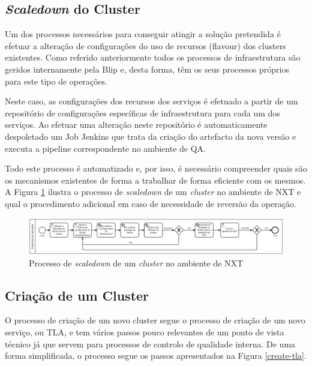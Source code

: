 \subsection{\textit{Scaledown} do Cluster}

Um dos processos necessários para conseguir atingir a solução pretendida é efetuar a alteração
de configurações do uso de recursos (\gls{flavour}) dos \glspl{cluster} existentes. Como
referido anteriormente todos os processos de infraestrutura são geridos internamente pela Blip e,
desta forma, têm os seus processos próprios para este tipo de operações.

Neste caso, as configurações dos recursos dos serviços é efetuado a partir de um repositório 
de configurações específicas de infraestrutura para cada um dos serviços. Ao efetuar uma alteração
neste repositório é automaticamente despoletado um Job Jenkins que trata da criação do artefacto
da nova versão e executa a \gls{pipeline} correspondente no ambiente de \ac{QA}.

Todo este processo é automatizado e, por isso, é necessário compreender quais são os mecanismos
existentes de forma a trabalhar de forma eficiente com os mesmos. A Figura \ref{scaledown-nxt} 
ilustra o processo de \textit{scaledown} de um \textit{cluster} no ambiente de NXT e qual o 
procedimento adicional em caso de necessidade de reversão da operação.

\begin{figure}[H]
  \centerline{\includegraphics[scale=0.12]{media/content/impl/scaledown_nxt.png}}
  \caption{Processo de \textit{scaledown} de um \textit{cluster} no ambiente de NXT}
  \label{scaledown-nxt}
\end{figure}

\subsection{Criação de um Cluster}

O processo de criação de um novo \gls{cluster} segue o processo de criação de um novo serviço, ou
\ac{TLA}, e tem vários passos pouco relevantes de um ponto de vista técnico já que servem para
processos de controlo de qualidade interna. De uma forma simplificada, o processo segue os passos
apresentados na Figura \ref{create-tla}.

